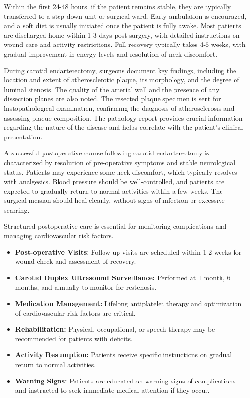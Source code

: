 Within the first 24-48 hours, if the patient remains stable, they are typically transferred to a step-down unit or surgical ward. Early ambulation is encouraged, and a soft diet is usually initiated once the patient is fully awake. Most patients are discharged home within 1-3 days post-surgery, with detailed instructions on wound care and activity restrictions. Full recovery typically takes 4-6 weeks, with gradual improvement in energy levels and resolution of neck discomfort.

During carotid endarterectomy, surgeons document key findings, including the location and extent of atherosclerotic plaque, its morphology, and the degree of luminal stenosis. The quality of the arterial wall and the presence of any dissection planes are also noted. The resected plaque specimen is sent for histopathological examination, confirming the diagnosis of atherosclerosis and assessing plaque composition. The pathology report provides crucial information regarding the nature of the disease and helps correlate with the patient's clinical presentation.

A successful postoperative course following carotid endarterectomy is characterized by resolution of pre-operative symptoms and stable neurological status. Patients may experience some neck discomfort, which typically resolves with analgesics. Blood pressure should be well-controlled, and patients are expected to gradually return to normal activities within a few weeks. The surgical incision should heal cleanly, without signs of infection or excessive scarring.

Structured postoperative care is essential for monitoring complications and managing cardiovascular risk factors. 

\begin{itemize}
  \item \textbf{Post-operative Visits:} Follow-up visits are scheduled within 1-2 weeks for wound check and assessment of recovery.

  \item \textbf{Carotid Duplex Ultrasound Surveillance:} Performed at 1 month, 6 months, and annually to monitor for restenosis.

  \item \textbf{Medication Management:} Lifelong antiplatelet therapy and optimization of cardiovascular risk factors are critical.

  \item \textbf{Rehabilitation:} Physical, occupational, or speech therapy may be recommended for patients with deficits.

  \item \textbf{Activity Resumption:} Patients receive specific instructions on gradual return to normal activities.

  \item \textbf{Warning Signs:} Patients are educated on warning signs of complications and instructed to seek immediate medical attention if they occur.
\end{itemize}

